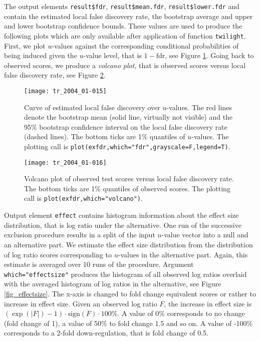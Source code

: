 \documentclass[11pt,a4paper,fleqn]{report}
\newcommand{\Robject}[1]{{\texttt{#1}}}
\newcommand{\Rfunction}[1]{{\texttt{#1}}}
\newcommand{\Rfunarg}[1]{{\texttt{#1}}}
\begin{document}
The output elements \Robject{result\$fdr}, \Robject{result\$mean.fdr}, \Robject{result\$lower.fdr} and \linebreak[5] \Robject{result\$upper.fdr} contain the estimated local false discovery rate, the bootstrap average and upper and lower bootstrap confidence bounds. These values are used to produce the following plots which are only available after application of function \Rfunction{twilight}. First, we plot $u$-values against the corresponding conditional probabilities of being induced given the $u$-value level, that is $1-\mbox{fdr}$, see Figure \ref{fig_fdr}. Going back to observed scores, we produce a \textit{volcano plot}, that is observed scores versus local false discovery rate, see Figure \ref{fig_volcano}.

\begin{figure}[t]
\begin{center}
\texttt{[image: tr\_2004\_01-015]}
\caption{Curve of estimated local false discovery over $u$-values. The red lines denote the bootstrap mean (solid line, virtually not visible) and the 95\% bootstrap confidence interval on the local false discovery rate (dashed lines). The bottom ticks are 1\% quantiles of $u$-values. The plotting call is  \texttt{plot(exfdr,which="fdr",grayscale=F,legend=T)}.}\label{fig_fdr}
\end{center}
\end{figure}


\begin{figure}[t]
\begin{center}
\texttt{[image: tr\_2004\_01-016]}
\caption{Volcano plot of observed test scores versus local false discovery rate. The bottom ticks are 1\% quantiles of observed scores. The plotting call is \texttt{plot(exfdr,which="volcano")}.}\label{fig_volcano}
\end{center}
\end{figure}

Output element \Robject{effect} contains histogram information about the effect size distribution, that is log ratio under the alternative. One run of the successive exclusion procedure results in a split of the input $u$-value vector into a null and an alternative part. We estimate the effect size distribution from the distribution of log ratio scores corresponding to $u$-values in the alternative part. Again, this estimate is averaged over 10 runs of the procedure. Argument \Rfunarg{which="effectsize"} produces the histogram of all observed log ratios overlaid with the averaged histogram of log ratios in the alternative, see Figure \ref{fig_effectsize}. The x-axis is changed to fold change equivalent scores or rather to increase in effect size. Given an observed log ratio $F$, the increase in effect size is $(\exp (|F|)-1) \cdot \mbox{sign} (F) \cdot 100\%$. A value of 0\% corresponds to no change (fold change of 1), a value of 50\% to fold change 1.5 and so on. A value of -100\% corresponds to a 2-fold down-regulation, that is fold change of 0.5.
\end{document}
